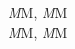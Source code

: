 \documentclass{article}
\begin{document}
	\noindent
	\textit{M}M, \textsl{M}M\\
	\textit{M\nocorr}M, \textsl{M\nocorr}M\\
\end{document}
